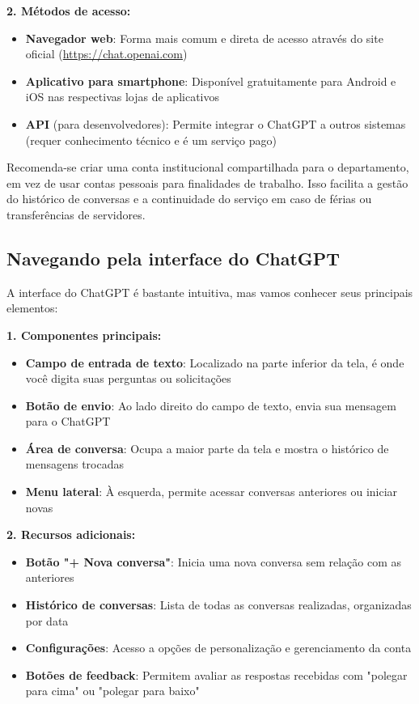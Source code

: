 \documentclass[12pt,a4paper]{book}
\begin{document}
\textbf{2. Métodos de acesso:}
\begin{itemize}
    \item \textbf{Navegador web}: Forma mais comum e direta de acesso através do site oficial (\url{https://chat.openai.com})
    \item \textbf{Aplicativo para smartphone}: Disponível gratuitamente para Android e iOS nas respectivas lojas de aplicativos
    \item \textbf{API} (para desenvolvedores): Permite integrar o ChatGPT a outros sistemas (requer conhecimento técnico e é um serviço pago)
\end{itemize}

\begin{tcolorbox}[dica]
Recomenda-se criar uma conta institucional compartilhada para o departamento, em vez de usar contas pessoais para finalidades de trabalho. Isso facilita a gestão do histórico de conversas e a continuidade do serviço em caso de férias ou transferências de servidores.
\end{tcolorbox}

\subsection{Navegando pela interface do ChatGPT}

A interface do ChatGPT é bastante intuitiva, mas vamos conhecer seus principais elementos:

\textbf{1. Componentes principais:}
\begin{itemize}
    \item \textbf{Campo de entrada de texto}: Localizado na parte inferior da tela, é onde você digita suas perguntas ou solicitações
    \item \textbf{Botão de envio}: Ao lado direito do campo de texto, envia sua mensagem para o ChatGPT
    \item \textbf{Área de conversa}: Ocupa a maior parte da tela e mostra o histórico de mensagens trocadas
    \item \textbf{Menu lateral}: À esquerda, permite acessar conversas anteriores ou iniciar novas
\end{itemize}

\textbf{2. Recursos adicionais:}
\begin{itemize}
    \item \textbf{Botão "+ Nova conversa"}: Inicia uma nova conversa sem relação com as anteriores
    \item \textbf{Histórico de conversas}: Lista de todas as conversas realizadas, organizadas por data
    \item \textbf{Configurações}: Acesso a opções de personalização e gerenciamento da conta
    \item \textbf{Botões de feedback}: Permitem avaliar as respostas recebidas com "polegar para cima" ou "polegar para baixo"
\end{itemize}
\end{document}
